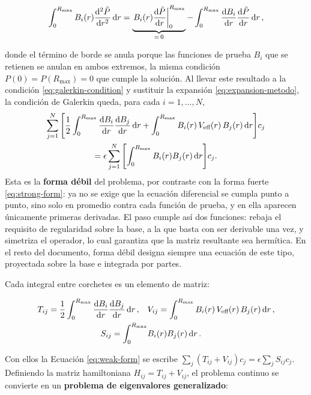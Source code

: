\begin{equation}
\label{eq:ibp-metodo}
  \int_{0}^{R_{\text{max}}} B_i(r) \dv[2]{\tilde{P}}{r} \dd{r} = \underbrace{\eval{ B_i(r) \dv{\tilde{P}}{r} }_{0}^{R_{\text{max}}}}_{=\,0} - \int_{0}^{R_{\text{max}}} \dv{B_i}{r} \dv{\tilde{P}}{r} \dd{r},
\end{equation}

donde el término de borde se anula porque las funciones de prueba $B_i$ que se retienen se anulan en ambos extremos, la misma condición $P(0) = P(R_{\text{max}}) = 0$ que cumple la solución. Al llevar este resultado a la condición \eqref{eq:galerkin-condition} y sustituir la expansión \eqref{eq:expansion-metodo}, la condición de Galerkin queda, para cada $i = 1, \dots, N$,
\begin{multline}
\label{eq:weak-form}
  \sum_{j=1}^{N} \qty[ \frac{1}{2}\int_{0}^{R_{\text{max}}} \dv{B_i}{r} \dv{B_j}{r} \dd{r} + \int_{0}^{R_{\text{max}}} B_i(r)\, V_{\text{eff}}(r)\, B_j(r) \dd{r} ] c_j \\
  = \epsilon \sum_{j=1}^{N} \qty[ \int_{0}^{R_{\text{max}}} B_i(r) B_j(r) \dd{r} ] c_j .
\end{multline}
Esta es la \textbf{forma débil} del problema, por contraste con la forma fuerte \eqref{eq:strong-form}: ya no se exige que la ecuación diferencial se cumpla punto a punto, sino solo en promedio contra cada función de prueba, y en ella aparecen únicamente primeras derivadas. El paso cumple así dos funciones: rebaja el requisito de regularidad sobre la base, a la que basta con ser derivable una vez, y simetriza el operador, lo cual garantiza que la matriz resultante sea hermítica. En el resto del documento, forma débil designa siempre una ecuación de este tipo, proyectada sobre la base e integrada por partes.

Cada integral entre corchetes es un elemento de matriz:

\begin{align}
  \label{eq:matrix-elements}
  T_{ij} = \frac{1}{2}\int_{0}^{R_{\text{max}}} \dv{B_i}{r} \dv{B_j}{r} \dd{r} \qc & 
  V_{ij}= \int_{0}^{R_{\text{max}}} B_i(r)\, V_{\text{eff}}(r)\, B_j(r) \dd{r}, \\
  S_{ij} = \int_{0}^{R_{\text{max}}} & B_i(r) B_j(r) \dd{r}. \label{eq:solapamiento}
\end{align}

Con ellos la Ecuación \eqref{eq:weak-form} se escribe $\sum_j (T_{ij} + V_{ij}) c_j = \epsilon \sum_j S_{ij} c_j$. Definiendo la matriz hamiltoniana $H_{ij} = T_{ij} + V_{ij}$, el problema continuo se convierte en un \textbf{problema de eigenvalores generalizado}:

